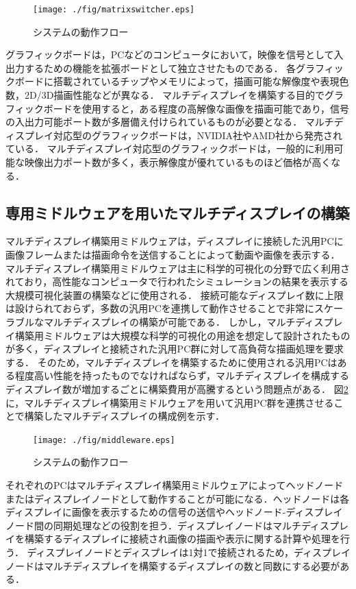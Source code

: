 \begin{figure}[htbp]
 \texttt{[image: ./fig/matrixswitcher.eps]}
 \caption{システムの動作フロー}
 \label{fig_2.1}
\end{figure}

グラフィックボードは，PCなどのコンピュータにおいて，映像を信号として入出力するための機能を拡張ボードとして独立させたものである．
各グラフィックボードに搭載されているチップやメモリによって，描画可能な解像度や表現色数，2D/3D描画性能などが異なる．
マルチディスプレイを構築する目的でグラフィックボードを使用すると，ある程度の高解像な画像を描画可能であり，信号の入出力可能ポート数が多層備え付けられているものが必要となる．
マルチディスプレイ対応型のグラフィックボードは，NVIDIA社やAMD社から発売されている．
マルチディスプレイ対応型のグラフィックボードは，一般的に利用可能な映像出力ポート数が多く，表示解像度が優れているものほど価格が高くなる．

\subsection{専用ミドルウェアを用いたマルチディスプレイの構築}

マルチディスプレイ構築用ミドルウェアは，ディスプレイに接続した汎用PCに画像フレームまたは描画命令を送信することによって動画や画像を表示する．
マルチディスプレイ構築用ミドルウェアは主に科学的可視化の分野で広く利用されており，高性能なコンピュータで行われたシミュレーションの結果を表示する大規模可視化装置の構築などに使用される．
接続可能なディスプレイ数に上限は設けられておらず，多数の汎用PCを連携して動作させることで非常にスケーラブルなマルチディスプレイの構築が可能である．
しかし，マルチディスプレイ構築用ミドルウェアは大規模な科学的可視化の用途を想定して設計されたものが多く，ディスプレイと接続された汎用PC群に対して高負荷な描画処理を要求する．
そのため，マルチディスプレイを構築するために使用される汎用PCはある程度高い性能を持ったものでなければならず，マルチディスプレイを構成するディスプレイ数が増加するごとに構築費用が高騰するという問題点がある．
図\ref{fig_2.2}に，マルチディスプレイ構築用ミドルウェアを用いて汎用PC群を連携させることで構築したマルチディスプレイの構成例を示す．

\begin{figure}[htbp]
 \texttt{[image: ./fig/middleware.eps]}
 \caption{システムの動作フロー}
 \label{fig_2.2}
\end{figure}

それぞれのPCはマルチディスプレイ構築用ミドルウェアによってヘッドノードまたはディスプレイノードとして動作することが可能になる．ヘッドノードは各ディスプレイに画像を表示するための信号の送信やヘッドノード-ディスプレイノード間の同期処理などの役割を担う．ディスプレイノードはマルチディスプレイを構築するディスプレイに接続され画像の描画や表示に関する計算や処理を行う．
ディスプレイノードとディスプレイは1対1で接続されるため，ディスプレイノードはマルチディスプレイを構築するディスプレイの数と同数にする必要がある．

